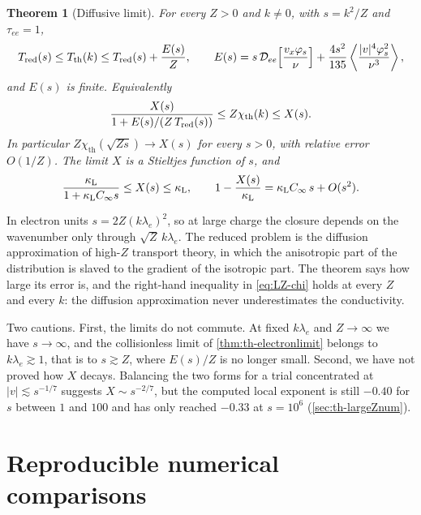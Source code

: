 \documentclass[11pt]{article}
\newcommand{\av}[1]{\left\langle #1\right\rangle}
\newcommand{\D}{\mathcal D}
\newcommand{\kap}{\kappa}
\newcommand{\thr}{\mathrm{th}}
\newtheorem{theorem}{Theorem}[section]
\theoremstyle{definition}
\theoremstyle{remark}
\numberwithin{equation}{section}
\begin{document}
\begin{theorem}[Diffusive limit]\label{thm:LZ-limit}
For every $Z>0$ and $k\ne0$, with $s=k^2/Z$ and $\tau_{ee}=1$,
\begin{equation}
 T_{\rm red}(s)\leq T_\thr(k)\leq T_{\rm red}(s)+\frac{E(s)}{Z},
 \qquad
 E(s)=s\,\D_{ee}\!\left[\frac{v_x\varphi_s}{\nu}\right]
      +\frac{4s^2}{135}\av{\frac{|v|^4\varphi_s^2}{\nu^3}},
 \label{eq:LZ-twosided}
\end{equation}
and $E(s)$ is finite. Equivalently
\begin{equation}
 \frac{X(s)}{1+E(s)/(Z\,T_{\rm red}(s))}\leq Z\chi_\thr(k)\leq X(s) .
 \label{eq:LZ-chi}
\end{equation}
In particular $Z\chi_\thr(\sqrt{Zs})\to X(s)$ for every $s>0$, with relative
error $O(1/Z)$. The limit $X$ is a Stieltjes function of $s$, and
\begin{equation}
 \frac{\kap_{\rm L}}{1+\kap_{\rm L}C_\infty s}\leq X(s)\leq\kap_{\rm L},
 \qquad 1-\frac{X(s)}{\kap_{\rm L}}=\kap_{\rm L}C_\infty\,s+O(s^2).
 \label{eq:LZ-Xbounds}
\end{equation}
\end{theorem}

In electron units $s=2Z(k\lambda_e)^2$, so at large charge the closure
depends on the wavenumber only through $\sqrt Z\,k\lambda_e$. The reduced
problem is the diffusion approximation of high-$Z$ transport theory, in
which the anisotropic part of the distribution is slaved to the gradient
of the isotropic part. The theorem says how large its error is, and the
right-hand inequality in \eqref{eq:LZ-chi} holds at every $Z$ and every
$k$: the diffusion approximation never underestimates the conductivity.

Two cautions. First, the limits do not commute. At fixed $k\lambda_e$ and
$Z\to\infty$ we have $s\to\infty$, and the collisionless limit of
\cref{thm:th-electronlimit} belongs to $k\lambda_e\gtrsim1$, that is to
$s\gtrsim Z$, where $E(s)/Z$ is no longer small. Second, we have not
proved how $X$ decays. Balancing the two forms for a trial concentrated at
$|v|\lesssim s^{-1/7}$ suggests $X\sim s^{-2/7}$, but the computed local
exponent is still $-0.40$ for $s$ between $1$ and $100$ and has only
reached $-0.33$ at $s=10^6$ (\cref{sec:th-largeZnum}).

\section{Reproducible numerical comparisons}\label{sec:numerics}
\end{document}
